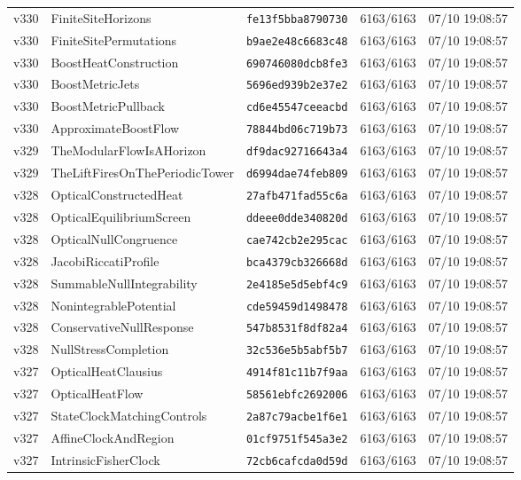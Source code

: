 \documentclass[11pt]{article}
\theoremstyle{definition}\newtheorem{deriv}{Derivação}
\begin{document}
{\begin{longtable}{@{}lllll@{}}
v330 & FiniteSiteHorizons & \texttt{fe13f5bba8790730} & 6163/6163 & 07/10 19:08:57 \\
v330 & FiniteSitePermutations & \texttt{b9ae2e48c6683c48} & 6163/6163 & 07/10 19:08:57 \\
v330 & BoostHeatConstruction & \texttt{690746080dcb8fe3} & 6163/6163 & 07/10 19:08:57 \\
v330 & BoostMetricJets & \texttt{5696ed939b2e37e2} & 6163/6163 & 07/10 19:08:57 \\
v330 & BoostMetricPullback & \texttt{cd6e45547ceeacbd} & 6163/6163 & 07/10 19:08:57 \\
v330 & ApproximateBoostFlow & \texttt{78844bd06c719b73} & 6163/6163 & 07/10 19:08:57 \\
v329 & TheModularFlowIsAHorizon & \texttt{df9dac92716643a4} & 6163/6163 & 07/10 19:08:57 \\
v329 & TheLiftFiresOnThePeriodicTower & \texttt{d6994dae74feb809} & 6163/6163 & 07/10 19:08:57 \\
v328 & OpticalConstructedHeat & \texttt{27afb471fad55c6a} & 6163/6163 & 07/10 19:08:57 \\
v328 & OpticalEquilibriumScreen & \texttt{ddeee0dde340820d} & 6163/6163 & 07/10 19:08:57 \\
v328 & OpticalNullCongruence & \texttt{cae742cb2e295cac} & 6163/6163 & 07/10 19:08:57 \\
v328 & JacobiRiccatiProfile & \texttt{bca4379cb326668d} & 6163/6163 & 07/10 19:08:57 \\
v328 & SummableNullIntegrability & \texttt{2e4185e5d5ebf4c9} & 6163/6163 & 07/10 19:08:57 \\
v328 & NonintegrablePotential & \texttt{cde59459d1498478} & 6163/6163 & 07/10 19:08:57 \\
v328 & ConservativeNullResponse & \texttt{547b8531f8df82a4} & 6163/6163 & 07/10 19:08:57 \\
v328 & NullStressCompletion & \texttt{32c536e5b5abf5b7} & 6163/6163 & 07/10 19:08:57 \\
v327 & OpticalHeatClausius & \texttt{4914f81c11b7f9aa} & 6163/6163 & 07/10 19:08:57 \\
v327 & OpticalHeatFlow & \texttt{58561ebfc2692006} & 6163/6163 & 07/10 19:08:57 \\
v327 & StateClockMatchingControls & \texttt{2a87c79acbe1f6e1} & 6163/6163 & 07/10 19:08:57 \\
v327 & AffineClockAndRegion & \texttt{01cf9751f545a3e2} & 6163/6163 & 07/10 19:08:57 \\
v327 & IntrinsicFisherClock & \texttt{72cb6cafcda0d59d} & 6163/6163 & 07/10 19:08:57 \\

\end{longtable}}
\end{document}
